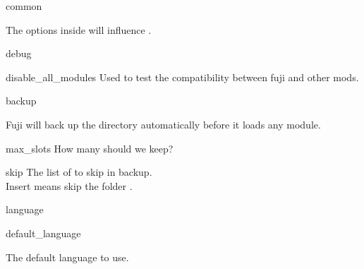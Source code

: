 \label{ch:configuration}



\begin{Configuration}
    \item[common]{
        The  options inside  will influence .

        \begin{NestedList}
            \item[debug]{
                \item[]

                \begin{NestedList}
                    \item[disable\_all\_modules]{
                        Used to test the compatibility between fuji and other mods.
                    }

                \end{NestedList}

            }
        \end{NestedList}

        \begin{NestedList}
            \item[backup]{
                Fuji will back up the  directory automatically before it loads any module.

                \begin{NestedList}
                    \item[max\_slots]{
                        How many  should we keep?
                    }

                    \item[skip]{
                        The list of  to skip in backup. \\
                        Insert  means skip the folder .
                    }
                \end{NestedList}
            }
        \end{NestedList}


        \begin{NestedList}
            \item[language]{
                \item[]

                \begin{NestedList}
                    \item[default\_language]{
                        The default language to use.

}
\end{NestedList}}
\end{NestedList}}
\end{Configuration}

